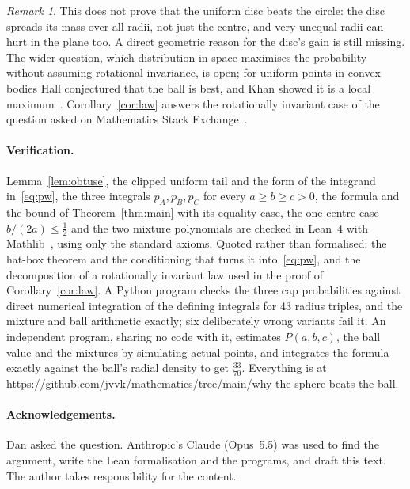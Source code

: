 \documentclass[11pt]{article}
\theoremstyle{remark}
\newtheorem*{remark}{Remark}
\begin{document}
\begin{remark}
This does not prove that the uniform disc beats the circle: the disc spreads its mass over all radii, not just
the centre, and very unequal radii can hurt in the plane too. A direct geometric reason for the disc's gain is
still missing. The wider question, which distribution in space maximises the probability without assuming
rotational invariance, is open; for uniform points in convex bodies Hall conjectured that the ball is best, and
Khan showed it is a local maximum~\cite{Hal82,Kha20}. Corollary~\ref{cor:law} answers the rotationally invariant
case of the question asked on Mathematics Stack Exchange~\cite{MSE}.
\end{remark}

\paragraph{Verification.} Lemma~\ref{lem:obtuse}, the clipped uniform tail and the form of the integrand
in~\eqref{eq:pw}, the three integrals $p_A,p_B,p_C$ for every $a\ge b\ge c>0$, the formula and the bound of
Theorem~\ref{thm:main} with its equality case, the one-centre case $b/(2a)\le\frac12$ and the two mixture
polynomials are checked in Lean~4 with Mathlib~\cite{mathlib}, using only the standard axioms. Quoted rather than
formalised: the hat-box theorem and the conditioning that turns it into~\eqref{eq:pw}, and the decomposition of
a rotationally invariant law used in the proof of Corollary~\ref{cor:law}. A Python program checks the three
cap probabilities against direct numerical integration of the defining integrals for 43 radius triples, and the
mixture and ball arithmetic exactly; six deliberately wrong variants fail it. An independent program, sharing no
code with it, estimates $P(a,b,c)$, the ball value and the mixtures by simulating actual points, and integrates
the formula exactly against the ball's radial density to get $\frac{33}{70}$. Everything is at
\url{https://github.com/jvvk/mathematics/tree/main/why-the-sphere-beats-the-ball}.

\paragraph{Acknowledgements.} Dan asked the question. Anthropic's Claude (Opus~5.5) was used to find the
argument, write the Lean formalisation and the programs, and draft this text. The author takes responsibility
for the content.
\end{document}
